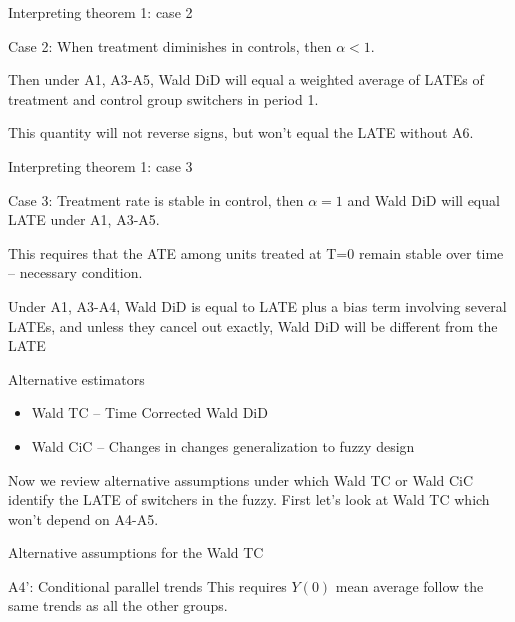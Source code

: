 \documentclass{beamer}
\begin{document}
\begin{frame}{Interpreting theorem 1: case 2}

Case 2: When treatment diminishes in controls, then $\alpha<1$. \\

\bigskip

Then under A1, A3-A5, Wald DiD will equal a weighted average of LATEs of treatment and control group switchers in period 1. \\

\bigskip

This quantity will not reverse signs, but won't equal the LATE without A6.

\end{frame}

\begin{frame}{Interpreting theorem 1: case 3}

Case 3: Treatment rate is stable in control, then $\alpha=1$ and Wald DiD will equal LATE under A1, A3-A5. \\

\bigskip

This requires that the ATE among units treated at T=0 remain stable over time -- necessary condition. \\

\bigskip

Under A1, A3-A4, Wald DiD is equal to LATE plus a bias term involving several LATEs, and unless they cancel out exactly, Wald DiD will be different from the LATE

\end{frame}

\begin{frame}{Alternative estimators}

\begin{itemize}
\item Wald TC -- Time Corrected Wald DiD
\item Wald CiC -- Changes in changes generalization to fuzzy design
\end{itemize}

Now we review alternative assumptions under which Wald TC or Wald CiC identify the LATE of switchers in the fuzzy.  First let's look at Wald TC which won't depend on A4-A5.

\end{frame}

\begin{frame}{Alternative assumptions for the Wald TC}

\begin{block}{A4': Conditional parallel trends}
This requires $Y(0)$ mean average follow the same trends as all the other groups.
\end{block}

\end{frame}
\end{document}
